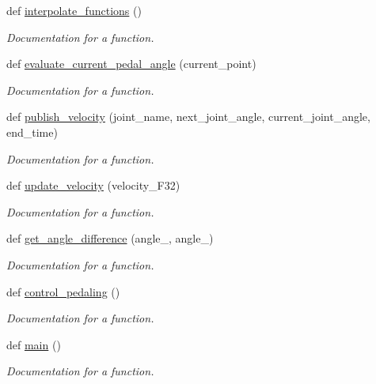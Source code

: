 \begin{DoxyCompactItemize}
def \mbox{\hyperlink{namespacepedal__simulation_ae626e831e45fb96c822364789c36c833}{interpolate\+\_\+functions}} ()
\begin{DoxyCompactList}\small\item\em Documentation for a function. \end{DoxyCompactList}\item 
def \mbox{\hyperlink{namespacepedal__simulation_aa15b4ab22216ca131bc54f6675a862e7}{evaluate\+\_\+current\+\_\+pedal\+\_\+angle}} (current\+\_\+point)
\begin{DoxyCompactList}\small\item\em Documentation for a function. \end{DoxyCompactList}\item 
def \mbox{\hyperlink{namespacepedal__simulation_a82494ebbbf26d1df9ae71ffebd8e86b3}{publish\+\_\+velocity}} (joint\+\_\+name, next\+\_\+joint\+\_\+angle, current\+\_\+joint\+\_\+angle, end\+\_\+time)
\begin{DoxyCompactList}\small\item\em Documentation for a function. \end{DoxyCompactList}\item 
def \mbox{\hyperlink{namespacepedal__simulation_a199c9ffebb39f117ec8b04d65d86a2c6}{update\+\_\+velocity}} (velocity\+\_\+\+F32)
\begin{DoxyCompactList}\small\item\em Documentation for a function. \end{DoxyCompactList}\item 
def \mbox{\hyperlink{namespacepedal__simulation_a33250e7cae81695eb6fdbd17683a77ec}{get\+\_\+angle\+\_\+difference}} (angle\+\_, angle\+\_)
\begin{DoxyCompactList}\small\item\em Documentation for a function. \end{DoxyCompactList}\item 
def \mbox{\hyperlink{namespacepedal__simulation_a3d0512a0cf73f1c663d92c5b63695d64}{control\+\_\+pedaling}} ()
\begin{DoxyCompactList}\small\item\em Documentation for a function. \end{DoxyCompactList}\item 
def \mbox{\hyperlink{namespacepedal__simulation_a727e35b81726e63028964cefc65d48c5}{main}} ()
\begin{DoxyCompactList}\small\item\em Documentation for a function. \end{DoxyCompactList}\end{DoxyCompactItemize}
